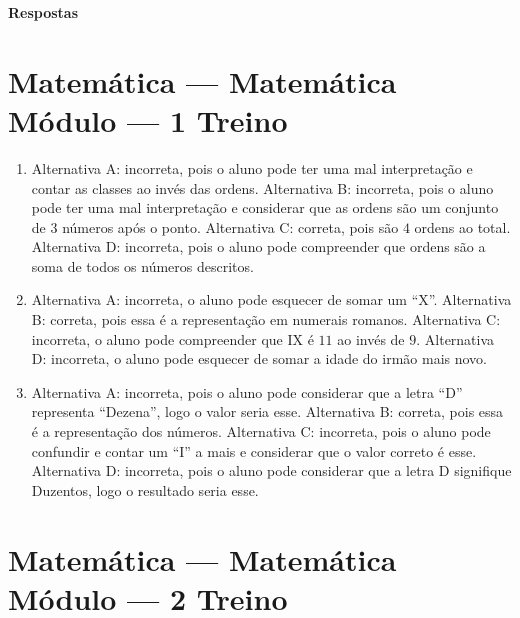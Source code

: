 
\pagebreak
\pagestyle{plain}

{\hfill\Large\bfseries Respostas}

\footnotesize

\pagecolor{gray!40}

\section*{Matemática — Matemática Módulo — 1 Treino}

\begin{enumerate}


\item Alternativa A: incorreta, pois o aluno pode ter uma mal interpretação e
contar as classes ao invés das ordens.
Alternativa B: incorreta, pois o aluno pode ter uma mal interpretação e
considerar que as ordens são um conjunto de $3$ números após o ponto.
Alternativa C: correta, pois são $4$ ordens ao total.
Alternativa D: incorreta, pois o aluno pode compreender que ordens são a
soma de todos os números descritos.

\item Alternativa A: incorreta, o aluno pode esquecer de somar um ``X''.
Alternativa B: correta, pois essa é a representação em numerais romanos.
Alternativa C: incorreta, o aluno pode compreender que IX é $11$ ao invés
de $9$.
Alternativa D: incorreta, o aluno pode esquecer de somar a idade do
irmão mais novo.

\item Alternativa A: incorreta, pois o aluno pode considerar que a letra ``D''
representa ``Dezena'', logo o valor seria esse.
Alternativa B: correta, pois essa é a representação dos números.
Alternativa C: incorreta, pois o aluno pode confundir e contar um ``I''
a mais e considerar que o valor correto é esse.
Alternativa D: incorreta, pois o aluno pode considerar que a letra D
signifique Duzentos, logo o resultado seria esse.
\end{enumerate}

\section*{Matemática — Matemática Módulo — 2 Treino}

